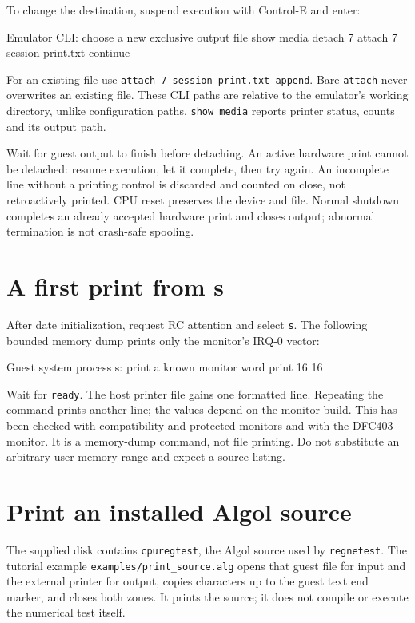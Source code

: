 To change the destination, suspend execution with Control-E and enter:

\begin{commandexample}{Emulator CLI: choose a new exclusive output file}
show media
detach 7
attach 7 session-print.txt
continue
\end{commandexample}

For an existing file use \texttt{attach 7 session-print.txt append}. Bare
\texttt{attach} never overwrites an existing file. These CLI paths are relative
to the emulator's working directory, unlike configuration paths.
\texttt{show media} reports printer status, counts and its output path.

Wait for guest output to finish before detaching. An active hardware print
cannot be detached: resume execution, let it complete, then try again.
An incomplete line without a printing control is discarded and counted on
close, not retroactively printed. CPU reset preserves the device and file.
Normal shutdown completes an already accepted hardware print and closes output;
abnormal termination is not crash-safe spooling.

\section{A first print from s}

After date initialization, request RC attention and select \texttt{s}.
The following bounded memory dump prints only the monitor's IRQ-0 vector:

\begin{commandexample}{Guest system process s: print a known monitor word}
print 16 16
\end{commandexample}

Wait for \texttt{ready}. The host printer file gains one formatted line.
Repeating the command prints another line; the values depend on the monitor
build. This has been checked with compatibility and protected monitors and
with the DFC403 monitor. It is a memory-dump command, not file printing.
Do not substitute an arbitrary user-memory range and expect a source listing.

\section{Print an installed Algol source}

The supplied disk contains \texttt{cpuregtest}, the Algol source used by
\texttt{regnetest}. The tutorial example \texttt{examples/print\_source.alg}
opens that guest file for input and the external printer for output, copies
characters up to the guest text end marker, and closes both zones. It prints
the source; it does not compile or execute the numerical test itself.

